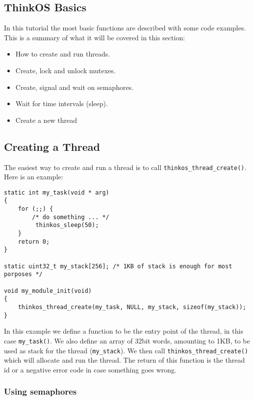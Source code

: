\subsection{ThinkOS Basics}

\lstset {language=C99}

In this tutorial the most basic \ThinkOS functions are described with some code examples. This is a summary of what it will be covered in this section:

\begin{itemize}
\item How to create and run threads.
\item Create, lock and unlock mutexes.
\item Create, signal and wait on semaphores.
\item Wait for time intervals (sleep).
\item Create a new thread
\end{itemize}

\subsection{Creating a Thread}

The easiest way to create and run a thread is to call \lstinline{thinkos_thread_create()}. Here is an example: 

\begin{lstlisting}[caption={Simple Thread Create Example},label={lst:example1},language=C99,frame=single]
static int my_task(void * arg)
{
    for (;;) {
        /* do something ... */
         thinkos_sleep(50);
    }
    return 0;
}

static uint32_t my_stack[256]; /* 1KB of stack is enough for most porposes */

void my_module_init(void)
{
    thinkos_thread_create(my_task, NULL, my_stack, sizeof(my_stack));
}
\end{lstlisting}

In this example we define a function to be the entry point of the thread, in this case \lstinline{my_task()}. We also define an array of 32bit words, amounting to 1KB, to be used as stack for the thread (\lstinline{my_stack}). We then call \lstinline{thinkos_thread_create()} which will allocate and run the thread. The return of this function is the thread id or a negative error code in case something goes wrong.

\subsubsection{Using semaphores}

